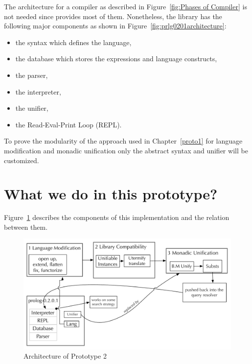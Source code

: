 \documentclass[thesis-solanki.tex]{subfiles}
\begin{document}
The architecture for a compiler as described in Figure~\ref{fig:Phases of Compiler} is not needed since
 provides most of them.
Nonetheless, the library has the following major components as shown in Figure~\ref{fig:prlg0201architecture}:

\begin{itemize}
\item the syntax which defines the language,

\item the database which stores the expressions and language constructs,

\item the parser,

\item the interpreter,

\item the unifier,

\item the Read-Eval-Print Loop (REPL).
\end{itemize}

To prove the modularity of the approach used in Chapter~\ref{proto1} for language modification and monadic
unification only the abstract syntax and unifier will be customized.

\section{What we do in this prototype?}

Figure~\ref{fig:architecture-proto-2} describes the components of this implementation and the relation between
them.

\begin{figure}[H]
  \includegraphics[width=1\textwidth]{Prototype-2-diagram.pdf}
\vspace*{-1cm}
  \caption{Architecture of Prototype 2}
  \label{fig:architecture-proto-2}
\end{figure}
\end{document}
